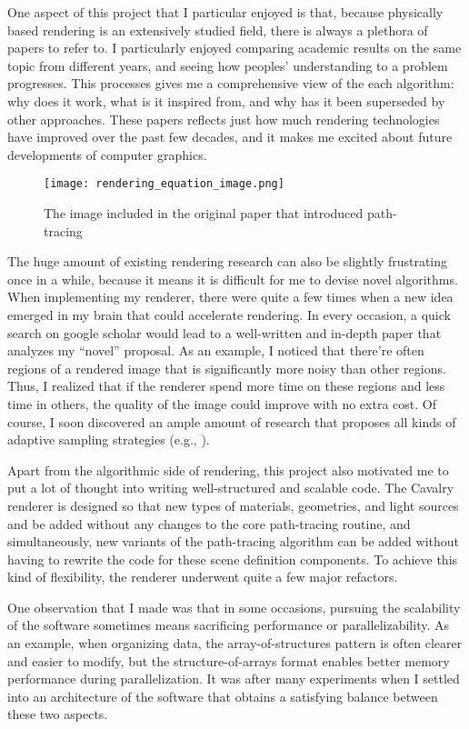 One aspect of this project that I particular enjoyed is that, because physically based rendering is an extensively studied field, there is always a plethora of papers to refer to. I particularly enjoyed comparing academic results on the same topic from different years, and seeing how peoples' understanding to a problem progresses. This processes gives me a comprehensive view of the each algorithm: why does it work, what is it inspired from, and why has it been superseded by other approaches. These papers reflects just how much rendering technologies have improved over the past few decades, and it makes me excited about future developments of computer graphics.

\begin{figure}[H]
    \centering
    \texttt{[image: rendering\_equation\_image.png]}
    \caption{The image included in the original paper\cite{rendering_equation} that introduced path-tracing}
\end{figure}

The huge amount of existing rendering research can also be slightly frustrating once in a while, because it means it is difficult for me to devise novel algorithms. When implementing my renderer, there were quite a few times when a new idea emerged in my brain that could accelerate rendering. In every occasion, a quick search on google scholar would lead to a well-written and in-depth paper that analyzes my ``novel'' proposal. As an example, I noticed that there're often regions of a rendered image that is significantly more noisy than other regions. Thus, I realized that if the renderer spend more time on these regions and less time in others, the quality of the image could improve with no extra cost. Of course, I soon discovered an ample amount of research that proposes all kinds of adaptive sampling strategies (e.g., \cite{rousselle2011adaptive}). 

Apart from the algorithmic side of rendering, this project also motivated me to put a lot of thought into writing well-structured and scalable code. The Cavalry renderer is designed so that new types of materials, geometries, and light sources and be added without any changes to the core path-tracing routine, and simultaneously, new variants of the path-tracing algorithm can be added without having to rewrite the code for these scene definition components. To achieve this kind of flexibility, the renderer underwent quite a few major refactors.

One observation that I made was that in some occasions, pursuing the scalability of the software sometimes means sacrificing performance or parallelizability. As an example, when organizing data, the array-of-structures pattern is often clearer and easier to modify, but the structure-of-arrays format enables better memory performance during parallelization. It was after many experiments when I settled into an architecture of the software that obtains a satisfying balance between these two aspects.

